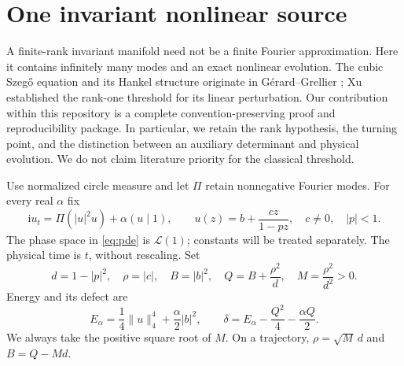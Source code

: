 \documentclass[10pt]{article}
\newcommand{\ii}{\mathrm i}
\newcommand{\LL}{\mathcal L}
\begin{document}
\section{One invariant nonlinear source}
A finite-rank invariant manifold need not be a finite Fourier approximation.
Here it contains infinitely many modes and an exact nonlinear evolution.
The cubic Szeg\H{o} equation and its Hankel structure originate in
G\'erard--Grellier \cite{gerard2010}; Xu \cite{xu2014} established the
rank-one threshold for its linear perturbation. Our contribution within
this repository is a complete convention-preserving proof and reproducibility
package. In particular, we retain the rank hypothesis, the turning point, and
the distinction between an auxiliary determinant and physical evolution.
We do not claim literature priority for the classical threshold.

Use normalized circle measure and let $\Pi$ retain nonnegative Fourier modes.
For every real $\alpha$ fix
\begin{equation}
 \ii u_t=\Pi(|u|^2u)+\alpha(u\mid1),\qquad
 u(z)=b+\frac{cz}{1-pz},\quad c\ne0,\quad |p|<1.
 \label{eq:pde}
\end{equation}
The phase space in \eqref{eq:pde} is $\LL(1)$; constants will be treated
separately. The physical time is $t$, without rescaling. Set
\begin{equation}
 d=1-|p|^2,\quad \rho=|c|,\quad B=|b|^2,\quad
 Q=B+\frac{\rho^2}{d},\quad M=\frac{\rho^2}{d^2}>0.
 \label{eq:invariants}
\end{equation}
Energy and its defect are
\begin{equation}
 E_\alpha=\frac14\|u\|_4^4+\frac\alpha2|b|^2,\qquad
 \delta=E_\alpha-\frac{Q^2}{4}-\frac{\alpha Q}{2}.
 \label{eq:defect}
\end{equation}
We always take the positive square root of $M$. On a trajectory,
$\rho=\sqrt M\,d$ and $B=Q-Md$.
\end{document}

